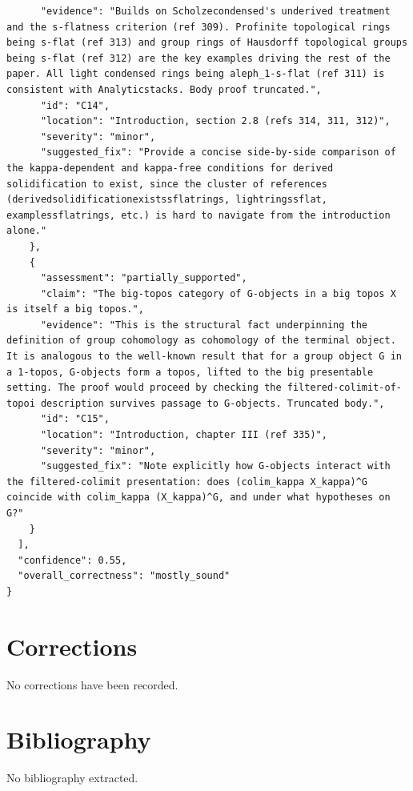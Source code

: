 \documentclass[11pt]{article}
\begin{document}
\begin{verbatim}
      "evidence": "Builds on Scholzecondensed's underived treatment and the s-flatness criterion (ref 309). Profinite topological rings being s-flat (ref 313) and group rings of Hausdorff topological groups being s-flat (ref 312) are the key examples driving the rest of the paper. All light condensed rings being aleph_1-s-flat (ref 311) is consistent with Analyticstacks. Body proof truncated.",
      "id": "C14",
      "location": "Introduction, section 2.8 (refs 314, 311, 312)",
      "severity": "minor",
      "suggested_fix": "Provide a concise side-by-side comparison of the kappa-dependent and kappa-free conditions for derived solidification to exist, since the cluster of references (derivedsolidificationexistssflatrings, lightringssflat, examplessflatrings, etc.) is hard to navigate from the introduction alone."
    },
    {
      "assessment": "partially_supported",
      "claim": "The big-topos category of G-objects in a big topos X is itself a big topos.",
      "evidence": "This is the structural fact underpinning the definition of group cohomology as cohomology of the terminal object. It is analogous to the well-known result that for a group object G in a 1-topos, G-objects form a topos, lifted to the big presentable setting. The proof would proceed by checking the filtered-colimit-of-topoi description survives passage to G-objects. Truncated body.",
      "id": "C15",
      "location": "Introduction, chapter III (ref 335)",
      "severity": "minor",
      "suggested_fix": "Note explicitly how G-objects interact with the filtered-colimit presentation: does (colim_kappa X_kappa)^G coincide with colim_kappa (X_kappa)^G, and under what hypotheses on G?"
    }
  ],
  "confidence": 0.55,
  "overall_correctness": "mostly_sound"
}
\end{verbatim}

\section*{Corrections}
No corrections have been recorded.

\section*{Bibliography}
No bibliography extracted.

% 
% 
\end{document}
